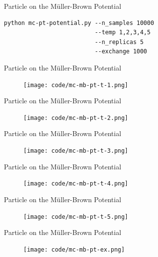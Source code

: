 \documentclass[10pt]{beamer}
\begin{document}
\begin{frame}[fragile]{Particle on the M\"uller-Brown Potential}
\begin{lstlisting}
python mc-pt-potential.py --n_samples 10000
                          --temp 1,2,3,4,5
                          --n_replicas 5
                          --exchange 1000
\end{lstlisting}
\end{frame}

\begin{frame}{Particle on the M\"uller-Brown Potential}
\begin{figure}
  \texttt{[image: code/mc-mb-pt-t-1.png]}
\end{figure}
\end{frame}

\begin{frame}{Particle on the M\"uller-Brown Potential}
\begin{figure}
  \texttt{[image: code/mc-mb-pt-t-2.png]}
\end{figure}
\end{frame}

\begin{frame}{Particle on the M\"uller-Brown Potential}
\begin{figure}
  \texttt{[image: code/mc-mb-pt-t-3.png]}
\end{figure}
\end{frame}

\begin{frame}{Particle on the M\"uller-Brown Potential}
\begin{figure}
  \texttt{[image: code/mc-mb-pt-t-4.png]}
\end{figure}
\end{frame}

\begin{frame}{Particle on the M\"uller-Brown Potential}
\begin{figure}
  \texttt{[image: code/mc-mb-pt-t-5.png]}
\end{figure}
\end{frame}

\begin{frame}{Particle on the M\"uller-Brown Potential}
\begin{figure}
  \texttt{[image: code/mc-mb-pt-ex.png]}
\end{figure}
\end{frame}
\end{document}
